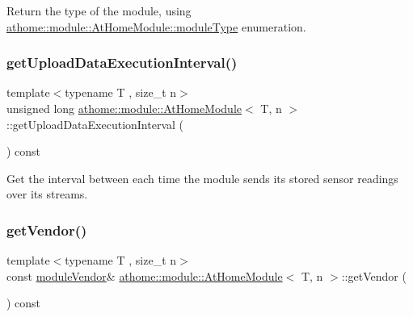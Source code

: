 Return the type of the module, using \mbox{\hyperlink{classathome_1_1module_1_1_at_home_module_a5075522baeaab0de681c26a5e5f18cd3}{athome\+::module\+::\+At\+Home\+Module\+::module\+Type}} enumeration. \mbox{\label{classathome_1_1module_1_1_at_home_module_a6186e04da0e46cf463d24947538380bb}} 
\subsubsection{\texorpdfstring{get\+Upload\+Data\+Execution\+Interval()}{getUploadDataExecutionInterval()}}
{\footnotesize\ttfamily template$<$typename T , size\+\_\+t n$>$ \\
unsigned long \mbox{\hyperlink{classathome_1_1module_1_1_at_home_module}{athome\+::module\+::\+At\+Home\+Module}}$<$ T, n $>$\+::get\+Upload\+Data\+Execution\+Interval (\begin{DoxyParamCaption}{ }\end{DoxyParamCaption}) const\hspace{0.3cm}{\ttfamily [inline]}}

Get the interval between each time the module sends its stored sensor readings over its streams. \mbox{\label{classathome_1_1module_1_1_at_home_module_ad96c0feb4eacedf3e3fa9383a53cd7f7}} 
\subsubsection{\texorpdfstring{get\+Vendor()}{getVendor()}}
{\footnotesize\ttfamily template$<$typename T , size\+\_\+t n$>$ \\
const \mbox{\hyperlink{classathome_1_1module_1_1_at_home_module_a90432f050114b268f7f7e0598dd8c9ac}{module\+Vendor}}\& \mbox{\hyperlink{classathome_1_1module_1_1_at_home_module}{athome\+::module\+::\+At\+Home\+Module}}$<$ T, n $>$\+::get\+Vendor (\begin{DoxyParamCaption}{ }\end{DoxyParamCaption}) const\hspace{0.3cm}{\ttfamily [inline]}}

